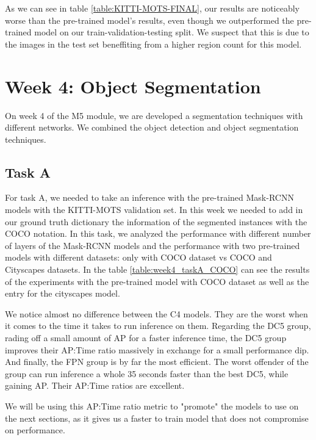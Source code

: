 \documentclass[12pt,a4paper,twocolumn,twoside]{article}
\begin{document}
As we can see in table \ref{table:KITTI-MOTS-FINAL}, our results are noticeably 
worse than the pre-trained model's results, even though we outperformed 
the pre-trained model on our train-validation-testing split. We suspect that this is due
to the images in the test set beneffiting from a higher region count for this model.

\section{Week 4: Object Segmentation}

On week 4 of the M5 module, we are developed a segmentation techniques with different networks. We combined the object detection and object segmentation techniques.

\subsection{Task A}

For task A, we needed to take an inference with the pre-trained Mask-RCNN models with the KITTI-MOTS validation set. In this week we needed to add in our ground truth dictionary the information of the segmented instances with the COCO notation.
In this task, we analyzed the performance with different number of layers of the Mask-RCNN models and the performance with two pre-trained models with different datasets: only with COCO dataset vs COCO and Cityscapes datasets. In the table \ref{table:week4_taskA_COCO} can see the results of the experiments with the pre-trained model with COCO dataset as well as the entry for the cityscapes model.

We notice almost no difference between the C4 models. They are the worst when it comes to the time it takes to run inference on them. Regarding the DC5 group, rading off a small amount of AP for a faster inference time, the DC5 group improves their AP:Time ratio massively in exchange for a small performance dip. And finally, the FPN group is by far the most efficient. The worst offender of the group can run inference a whole 35 seconds faster than the best DC5, while gaining AP. Their AP:Time ratios are excellent.

We will be using this AP:Time ratio metric to "promote" the models to use on the next sections, as it gives us a faster to train model that does not compromise on performance.
\end{document}
